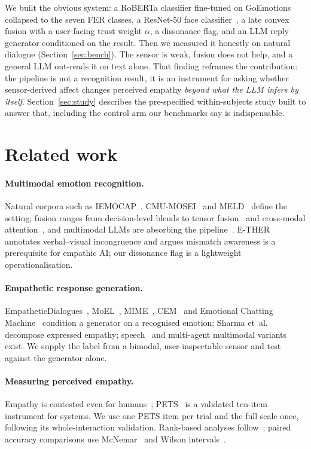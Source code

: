 \documentclass[sigconf,nonacm]{acmart}
\begin{document}
We built the obvious system: a RoBERTa classifier fine-tuned on GoEmotions~\cite{liu2019roberta,demszky2020goemotions} collapsed to the seven FER classes, a ResNet-50 face classifier~\cite{he2016resnet,goodfellow2013challenges}, a late convex fusion with a user-facing trust weight $\alpha$, a dissonance flag, and an LLM reply generator conditioned on the result. Then we measured it honestly on natural dialogue (Section~\ref{sec:bench}). The sensor is weak, fusion does not help, and a general LLM out-reads it on text alone. That finding reframes the contribution: the pipeline is not a recognition result, it is an instrument for asking whether sensor-derived affect changes perceived empathy \emph{beyond what the LLM infers by itself}. Section~\ref{sec:study} describes the pre-specified within-subjects study built to answer that, including the control arm our benchmarks say is indispensable.

\section{Related work}
\paragraph{Multimodal emotion recognition.} Natural corpora such as IEMOCAP~\cite{busso2008iemocap}, CMU-MOSEI~\cite{zadeh2018mosei} and MELD~\cite{poria2019meld} define the setting; fusion ranges from decision-level blends to tensor fusion~\cite{zadeh2017tensor} and cross-modal attention~\cite{tsai2019mult}, and multimodal LLMs are absorbing the pipeline~\cite{zhang2026mer_llm_survey}. E-THER~\cite{tahir2025ether} annotates verbal--visual incongruence and argues mismatch awareness is a prerequisite for empathic AI; our dissonance flag is a lightweight operationalisation.
\paragraph{Empathetic response generation.} EmpatheticDialogues~\cite{rashkin2019empathetic}, MoEL~\cite{lin2019moel}, MIME~\cite{majumder2020mime}, CEM~\cite{sabour2022cem} and Emotional Chatting Machine~\cite{zhou2018ecm} condition a generator on a recognised emotion; Sharma et~al.~\cite{sharma2020epitome} decompose expressed empathy; speech~\cite{wang2024blspemo} and multi-agent multimodal variants~\cite{wang2026multiagent_merg} exist. We supply the label from a bimodal, user-inspectable sensor and test against the generator alone.
\paragraph{Measuring perceived empathy.} Empathy is contested even for humans~\cite{cuff2016empathy}; PETS~\cite{schmidmaier2024pets} is a validated ten-item instrument for systems. We use one PETS item per trial and the full scale once, following its whole-interaction validation. Rank-based analyses follow~\cite{wobbrock2011art}; paired accuracy comparisons use McNemar~\cite{mcnemar1947note} and Wilson intervals~\cite{wilson1927probable}.
\end{document}
